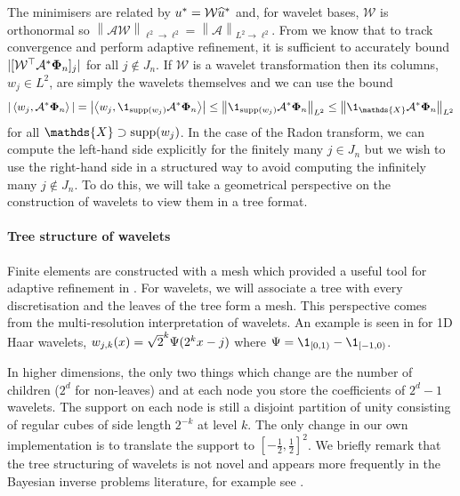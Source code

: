 \documentclass[10pt,a4paper,onecolumn]{article}
\numberwithin{equation}{section}
\let\F\mathds\let\C\mathcal\newcommand{\R}{\F{R}}\newcommand{\A}{\C{A}}
\newcommand{\norm}[1]{{\left\lVert #1 \right\rVert}}
\newcommand{\IP}[2]{\left\langle #1,#2 \right\rangle}\newcommand{\ip}[2]{#1 \vcenter{\hbox{\resizebox{6pt}{!}{\ensuremath\cdot}}} #2}
\renewcommand{\vec}{\mathbf}
\let\linop\C
\newcommand{\UCmath}[1]{%
	\begingroup
	\ucmathlist\uppercase\expandafter{#1}%
	\endgroup
}
\newcommand{\ucmathlist}{%
	\def\alpha{\mathrm{A}}%
	\def\beta{\mathrm{B}}%
	\let\gamma=\Gamma
	\let\delta=\Delta
	\def\epsilon{\mathrm{E}}%
	\def\varepsilon{\mathrm{E}}%
	\def\zeta{\mathrm{Z}}%
	\def\eta{\mathrm{H}}%
	\let\theta=\Theta
	\let\vartheta=\Theta
	\def\iota{\mathrm{I}}%
	\def\kappa{\mathrm{K}}%
	\let\lambda=\Lambda
	\def\mu{\mathrm{M}}%
	\def\nu{\mathrm{N}}%
	\let\xi=\Xi
	\let\pi=\Pi
	\let\varpi=\Pi
	\def\rho{\mathrm{P}}%
	\def\varrho{\mathrm{P}}%
	\let\sigma=\Sigma
	\def\tau{\mathrm{T}}%
	\let\upsilon=\Upsilon
	\let\phi=\Phi
	\let\varphi=\Phi
	\def\chi{\mathrm{X}}%
	\let\psi=\Psi
	\let\omega=\Omega
}
\newcommand{\caps}[1]{\UCmath{#1}}
\newcommand*{\varf}[1]{%
	\IfEqCase{#1}{%
		{0}{u}%
		{1}{v}%
		{2}{w}%
	}[u#1]%
}
\newcommand*{\vard}[1]{%
	\IfEqCase{#1}{%
		{0}{\varphi}%
		{1}{\psi}%
	}[\varphi #1]%
}
\newcommand*{\varx}[1]{%
	\IfEqCase{#1}{%
		{0}{x}%
		{1}{y}%
		{2}{z}%
		{3}{r}%
	}[x#1]%
}
\newcommand*{\data}[1]{%
	\IfEqCase{#1}{%
		{0}{\eta}%
		{1}{\nu}%
	}[g]%
}
\newcommand*{\Varx}[1]{\caps{\varx{#1}}}
\newcommand*{\vvard}[1]{\vec{\vard{#1}}}\newcommand*{\vdata}[1]{\vec{\data{#1}}}
\begin{document}
The minimisers are related by $\varf0^* = \linop{W}\hat{\varf0}^*$ and, for wavelet bases, $\linop{W}$ is orthonormal so $\norm{\A\linop{W}}_{\ell^2\to\ell^2} = \norm{\A}_{L^2\to\ell^2}$. From  we know that to track convergence and perform adaptive refinement, it is sufficient to accurately bound $|[\linop{W}^\top \A^*\vvard0_n]_j|$ for all $j\notin J_n$. If $\linop{W}$ is a wavelet transformation then its columns, $w_j\in L^2$, are simply the wavelets themselves and we can use the bound 
\begin{equation}
	|\IP{w_j}{\A^*\vvard0_n}| = \left|\IP{w_j}{\1_{\supp(w_j)}\A^*\vvard0_n}\right| \leq \norm{\1_{\supp(w_j)} \A^*\vvard0_n}_{L^2}\leq \norm{\1_{\F{\Varx0}} \A^*\vvard0_n}_{L^2}
\end{equation}
for all $\F{\Varx0}\supset \supp(w_j)$.
In the case of the Radon transform, we can compute the left-hand side explicitly for the finitely many $j\in J_n$ but we wish to use the right-hand side in a structured way to avoid computing the infinitely many $j\notin J_n$. To do this, we will take a geometrical perspective on the construction of wavelets to view them in a tree format. 

\paragraph{Tree structure of wavelets}
Finite elements are constructed with a mesh which provided a useful tool for adaptive refinement in . For wavelets, we will associate a tree with every discretisation and the leaves of the tree form a mesh. This perspective comes from the multi-resolution interpretation of wavelets. An example is seen in  for 1D Haar wavelets, $w_{j,k}(\varx0) = \sqrt{2}^k\vard1(2^{k}\varx0-j)$ where $\vard1 = \1_{[0,1)} - \1_{[-1,0)}$. 

In higher dimensions, the only two things which change are the number of children ($2^d$ for non-leaves) and at each node you store the coefficients of $2^d-1$ wavelets. The support on each node is still a disjoint partition of unity consisting of regular cubes of side length $2^{-k}$ at level $k$. The only change in our own implementation is to translate the support to $[-\tfrac12,\tfrac12]^2$. We briefly remark that the tree structuring of wavelets is not novel and appears more frequently in the Bayesian inverse problems literature, for example see \citet{Castillo2019}.
\end{document}
